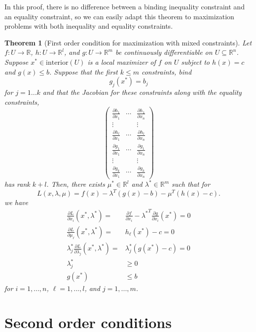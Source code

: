 \documentclass[12pt,reqno]{amsart}
\newtheorem{theorem}{Theorem}[section]
\theoremstyle{definition}
\def\R{\mathbb{R}}
\renewcommand{\to}{{\rightarrow}}
\begin{document}
In this proof, there is no difference between a binding
inequality constraint and an equality constraint, so we can easily
adapt this theorem to maximization problems with both inequality and
equality constraints.

\begin{theorem}[First order condition for maximization with mixed constraints] \label{thm:mcon}
  Let $f:U \to \R$, $h:U \to \R^l$, and $g: U \to \R^m$ be
  continuously differentiable on $U \subseteq \R^n$. Suppose $x^* \in 
  \mathrm{interior}(U)$ is a local maximizer of $f$ on $U$ subject to 
  $h(x) = c$ and $g(x) \leq b$. Suppose that the first $k \leq m$
  constraints, bind 
  \[ g_j(x^*) = b_j \]
  for $j = 1 ... k$ and that the Jacobian for these constraints along
  with the equality constraints,
  \[ \begin{pmatrix} 
    \frac{\partial h_1}{\partial x_1} &  \cdots &\frac{\partial
      h_1}{\partial x_n}  \\
    \vdots & & \vdots \\
    \frac{\partial h_l}{\partial x_1} &  \cdots &\frac{\partial
      h_l}{\partial x_n}  \\    
    \frac{\partial g_1}{\partial x_1} &  \cdots &\frac{\partial g_1}{\partial x_n}  \\
    \vdots & & \vdots \\
    \frac{\partial g_k}{\partial x_1} &  \cdots &\frac{\partial
      g_k}{\partial x_n}  
  \end{pmatrix}
  \]
  has rank $k+l$. Then, there exists
  $\mu^* \in \R^l$ and $\lambda^* \in \R^m$ such that for 
  \[ L(x,\lambda,\mu) = f(x) - \lambda^T (g(x) - b) - \mu^T(h(x) - c). \]
  we have
  \begin{align*}
    \frac{\partial L}{\partial x_i}(x^*,\lambda^*) = & \frac{\partial
      f}{\partial x_i} - {\lambda^*}^T \frac{\partial g}{\partial
      x_i}(x^*) = 0 \\
    \frac{\partial L}{\partial \mu_\ell}(x^*,\lambda^*) = & h_\ell(x^*) - c = 0 \\
    \lambda_j^* \frac{\partial L}{\partial \lambda_j}(x^*,\lambda^*) =
    & \lambda_j^* \left(g(x^*) - c \right)= 0 \\
    \lambda_j^* & \geq 0 \\
    g(x^*) & \leq b
  \end{align*}
  for $i = 1, ..., n$, $\ell = 1,..., l$, and $j=1,...,m$.
\end{theorem}

\section{Second order conditions}
\end{document}
